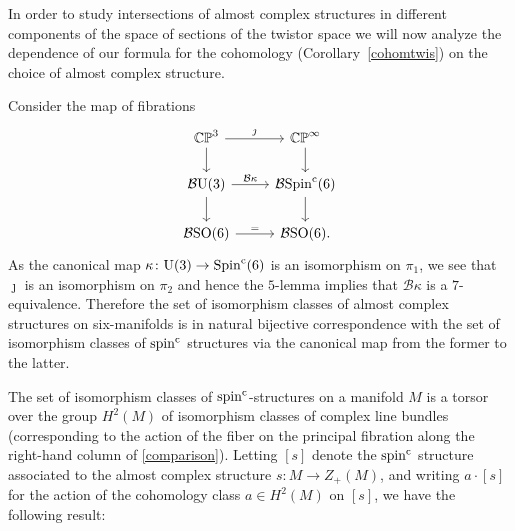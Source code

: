 \documentclass[pdftex]{sigma}%
\newcommand{\CP}{\mathbb{CP}}
\DeclareMathOperator{\Spin}{Spin}
\numberwithin{equation}{section}
\begin{document}
In order to study intersections of almost complex structures in different components of the space of sections of the twistor space we will now analyze the dependence of our formula for the cohomology (Corollary~\ref{cohomtwis}) on the choice of almost complex structure.

Consider the map of fibrations
\begin{equation}
\label{comparison}
\begin{tikzcd}
\CP^3 \ar[r,"\jmath"] \ar[d] & \CP^\infty \ar[d] \\
{\mathcal B}{\rm U}(3) \ar[r,"{\mathcal B}\kappa"] \ar[d] & {\mathcal B}{\rm Spin}^{\rm c}(6)\ar[d] \\
{\mathcal B}{\rm SO}(6) \ar[r,"="] & {\mathcal B}{\rm SO}(6).
\end{tikzcd}
\end{equation}
As the canonical map $\kappa \colon {\rm U}(3) \to \Spin^{\rm c}(6)$ is an isomorphism on $\pi_1$, we see
that $\jmath$ is an isomorphism on $\pi_2$ and hence the $5$-lemma implies that ${\mathcal B}\kappa$ is a
$7$-equivalence. Therefore the set of isomorphism classes of almost complex structures on six-manifolds is in natural bijective correspondence with the set of isomorphism classes of ${\rm spin}^{\rm c}$ structures via the canonical map from the former to the latter.

The set of isomorphism classes of ${\rm spin}^{\rm c}$-structures on a manifold $M$ is a torsor over the group $H^2(M)$
of isomorphism classes of complex line bundles
(corresponding to the action of the fiber on
the principal fibration along the right-hand column of \eqref{comparison}). Letting
$[s]$ denote the ${\rm spin}^{\rm c}$ structure associated to the almost complex structure $s\colon
M \to Z_+(M)$, and writing $a \cdot [s]$ for the action of the cohomology class
$a \in H^2(M)$ on $[s]$, we have the following result:
\end{document}

